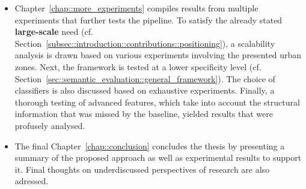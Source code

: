 \begin{itemize}[label=\(\blacktriangleright\)]
        \item Chapter~\ref{chap::more_experiments} compiles results from multiple experiments that further tests the pipeline.
                To satisfy the already stated \textbf{large-scale} need (cf. Section~\ref{subsec::introduction::contributions::positioning}), a scalability analysis is drawn based on various experiments involving the presented urban zones.
                Next, the framework is tested at a lower specificity level (cf. Section~\ref{sec::semantic_evaluation::general_framework}).
                The choice of classifiers is also discussed based on exhaustive experiments.
                Finally, a thorough testing of advanced features, which take into account the structural information that was missed by the baseline, yielded results that were profusely analysed.
        \item The final Chapter~\ref{chap::conclusion} concludes the thesis by presenting a summary of the proposed approach as well as experimental results to support it.
                Final thoughts on underdiscussed perspectives of research are also adressed.
    \end{itemize}
